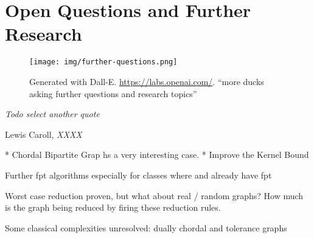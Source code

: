 \chapter{Open Questions and Further Research}\label{ch:closing}

\vspace*{-50pt}

\begin{figure}[ht]
        \texttt{[image: img/further-questions.png]}
        \captionsetup{textformat=empty,labelformat=blank}
        \caption{Generated with Dall-E. \url{https://labs.openai.com/}. ``more ducks asking further questions and research topics''}
\end{figure}

\epigraph{\itshape Todo select another quote}{Lewis Caroll, \textit{XXXX}}

* Chordal Bipartite Grap hs a very interesting case.
* Improve the Kernel Bound

Further fpt algorithms especially for classes where \sdom and \tdom already have fpt 

Worst case reduction proven, but what about real / random graphs? How much is the graph being reduced by firing these reduction rules.

Some classical complexities unresolved: dually chordal and tolerance graphs
